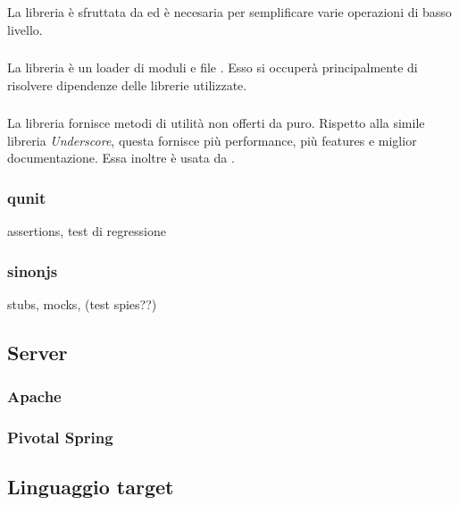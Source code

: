 \subsubsection{\jquery}
La libreria \jquery{} è sfruttata da \jointjs{} ed è necesaria per semplificare varie operazioni di basso livello. 


\subsubsection{\requirejs}
La libreria \requirejs{} è un loader di moduli e file \js{}. Esso si occuperà principalmente di risolvere dipendenze delle librerie \js{} utilizzate.

\subsubsection{\lodash}
La libreria \lodash{} fornisce metodi di utilità non offerti da \js{} puro. Rispetto alla simile libreria \emph{Underscore}, questa fornisce più performance, più features e miglior documentazione. Essa inoltre è usata da \jointjs{}.


\subsubsection{qunit}
assertions, test di regressione
\subsubsection{sinonjs}
stubs, mocks, (test spies??)

\subsection{Server}


\subsubsection{Apache }

\subsubsection{Pivotal Spring}




\subsection{Linguaggio target}

